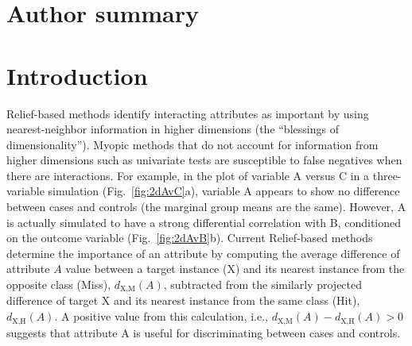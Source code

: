 \documentclass[10pt,letterpaper]{article}\usepackage[]{graphicx}\usepackage[]{color}
\begin{document}
\section*{Author summary}

\linenumbers

\section*{Introduction}

Relief-based methods identify interacting attributes as important by using nearest-neighbor information in higher dimensions (the ``blessings of dimensionality''). Myopic methods that do not account for information from higher dimensions such as univariate tests are susceptible to false negatives when there are interactions. For example, in the plot of variable A versus C in a three-variable simulation (Fig.~\ref{fig:2dAvC}a), variable A appears to show no difference between cases and controls (the marginal group means are the same). However, A is actually simulated to have a strong differential correlation with B, conditioned on the outcome variable (Fig.~\ref{fig:2dAvB}b). Current Relief-based methods determine the importance of an attribute by computing the average difference of attribute $A$ value between a target instance (X) and its nearest instance from the opposite class (Miss), $d_{\text{X,M}}(A)$, subtracted from the similarly projected difference of target X and its nearest instance from the same class (Hit), $d_{\text{X,H}}(A)$. A positive value from this calculation, i.e., $d_{\text{X,M}}(A)-d_{\text{X,H}}(A) > 0$ suggests that attribute A is useful for discriminating between cases and controls.  
\end{document}
